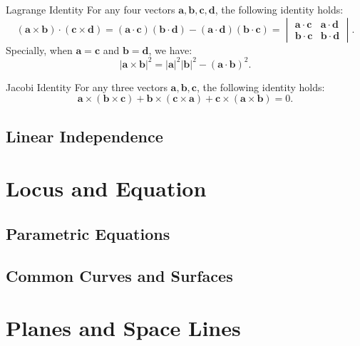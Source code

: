 \documentclass[11pt]{../../TexTemplate/elegantbook} %
\begin{document}
\begin{theorem}{Lagrange Identity}
    For any four vectors \(\mathbf{a}, \mathbf{b}, \mathbf{c}, \mathbf{d}\), the following identity holds:
    \[
    (\mathbf{a} \times \mathbf{b}) \cdot (\mathbf{c} \times \mathbf{d}) = 
    (\mathbf{a} \cdot \mathbf{c})(\mathbf{b} \cdot \mathbf{d}) - (\mathbf{a} \cdot \mathbf{d})(\mathbf{b} \cdot \mathbf{c})
    = \begin{vmatrix}
        \mathbf{a} \cdot \mathbf{c} & \mathbf{a} \cdot \mathbf{d} \\
        \mathbf{b} \cdot \mathbf{c} & \mathbf{b} \cdot \mathbf{d}
    \end{vmatrix}.
    \]
    Specially, when \(\mathbf{a} = \mathbf{c}\) and \(\mathbf{b} = \mathbf{d}\), we have:
    \[
    |\mathbf{a} \times \mathbf{b}|^{2} = |\mathbf{a}|^{2}|\mathbf{b}|^{2} - (\mathbf{a} \cdot \mathbf{b})^{2}.
    \]
\end{theorem}

\begin{theorem}{Jacobi Identity}
    For any three vectors \(\mathbf{a}, \mathbf{b}, \mathbf{c}\), the following identity holds:
    \[
    \mathbf{a} \times (\mathbf{b} \times \mathbf{c}) + \mathbf{b} \times (\mathbf{c} \times \mathbf{a}) + \mathbf{c} \times (\mathbf{a} \times \mathbf{b}) = 0.
    \]
\end{theorem}


\section{Linear Independence}

\chapter{Locus and Equation}
\section{Parametric Equations}

\section{Common Curves and Surfaces}

\chapter{Planes and Space Lines}
\end{document}
